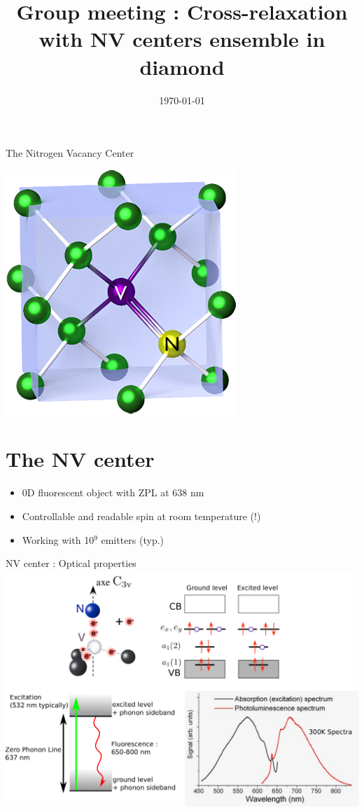 \documentclass{beamer}
\title{Group meeting : Cross-relaxation with NV centers ensemble in diamond}
\date\today
\begin{document}
\begin{frame}
\maketitle
\end{frame}
\begin{frame}{The Nitrogen Vacancy Center}
\begin{center}
\includegraphics[scale=.4]{Nitrogen-vacancy_center}
\end{center}

\section{The NV center}
\begin{itemize}
\item 0D fluorescent object with ZPL at 638 nm
\item Controllable and readable spin at room temperature (!)
\item Working with 10$^9$ emitters (typ.)
\end{itemize}
\end{frame}
\begin{frame}{NV center : Optical properties}
\centering
\includegraphics[scale=.4]{slide_NV_optical}
\end{frame}
\end{document}
